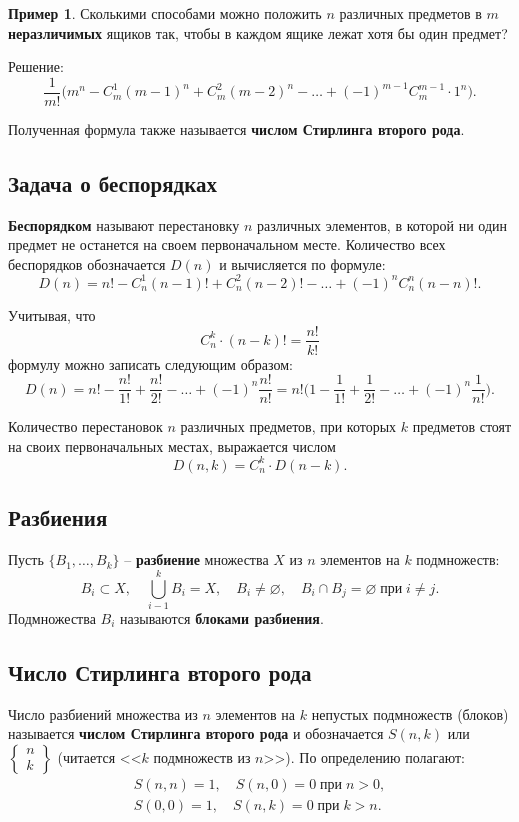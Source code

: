 \documentclass[a5paper, 11pt]{extarticle}
\theoremstyle{definition}
\newtheorem{example}{Пример}[subsection]
\theoremstyle{definition}
\theoremstyle{definition}
\numberwithin{figure}{section}
\numberwithin{table}{section}
\begin{document}
\begin{example}
    Сколькими способами можно положить \(n\) различных предметов в \(m\) \textbf{неразличимых} ящиков так, чтобы в каждом ящике лежат хотя бы один предмет?

    Решение:
    \[
        \frac{1}{m!} \Big( m^n - C_m^1 (m - 1)^n + C_m^2 (m - 2)^n - \ldots + (-1)^{m - 1} C_m^{m - 1} \cdot 1^n \Big).
    \]

    Полученная формула также называется \textbf{числом Стирлинга второго рода}.
\end{example}

\subsection{Задача о беспорядках}

\textbf{Беспорядком} называют перестановку \(n\) различных элементов, в которой ни один предмет не останется на своем первоначальном месте. Количество всех беспорядков обозначается \(D(n)\) и вычисляется по формуле:
\[
    D(n) = n! - C_n^1 (n - 1)! + C_n^2 (n - 2)! - \ldots + (-1)^n C_n^n (n - n)!.
\]

Учитывая, что
\[
    C_n^k \cdot (n - k)! = \frac{n!}{k!}
\]
формулу можно записать следующим образом:
\[
    D(n) =
    n! - \frac{n!}{1!} + \frac{n!}{2!} - \ldots + (-1)^n \frac{n!}{n!} =
    n! \Big( 1 - \frac{1}{1!} + \frac{1}{2!} - \ldots + (-1)^n \frac{1}{n!} \Big).
\]

Количество перестановок \(n\) различных предметов, при которых \(k\) предметов стоят на своих первоначальных местах, выражается числом
\[
    D(n, k) = C_n^k \cdot D(n - k).
\]

\subsection{Разбиения}

Пусть \(\{B_1, \ldots, B_k\}\) -- \textbf{разбиение} множества \(X\) из \(n\) элементов на \(k\) подмножеств:
\[
    B_i \subset X,
    \quad
    \bigcup_{i - 1}^k B_i = X,
    \quad
    B_i \neq \varnothing,
    \quad
    B_i \cap B_j = \varnothing \; \text{при} \; i \neq j.
\]
Подмножества \(B_i\) называются \textbf{блоками разбиения}.

\subsection{Число Стирлинга второго рода}

Число разбиений множества из \(n\) элементов на \(k\) непустых подмножеств (блоков) называется \textbf{числом Стирлинга второго рода} и обозначается \(S(n, k)\) или \(\displaystyle \begin{Bmatrix} n \\ k \end{Bmatrix} \) (читается <<\(k\) подмножеств из \(n\)>>). По определению полагают:
\begin{gather*}
    S(n, n) = 1,
    \quad
    S(n, 0) = 0 \; \text{при} \; n > 0,
    \\
    S(0, 0) = 1,
    \quad
    S(n, k) = 0 \; \text{при} \; k > n.
\end{gather*}
\end{document}
